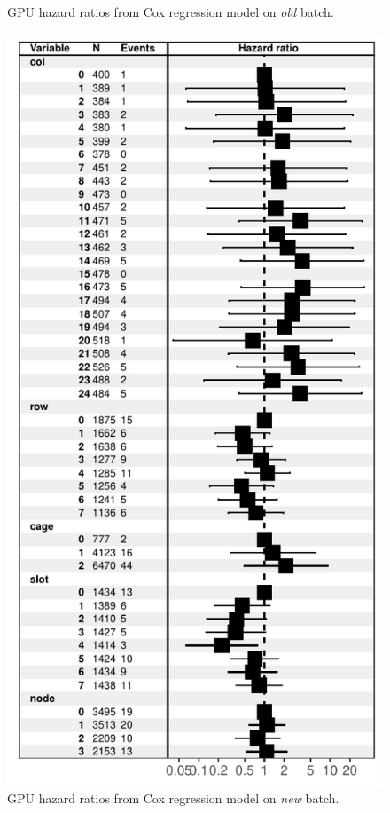 \begin{figure}
  \caption{GPU hazard ratios from Cox regression model on {\em old}
    batch.}
  \label{fig:cox-old}
\end{figure}
\begin{figure}
  \centering
  \includegraphics[width=\columnwidth]{figs/cox_n001.pdf}
  \caption{GPU hazard ratios from Cox regression model on {\em new}
    batch.}
  \label{fig:cox-new}
\end{figure}

